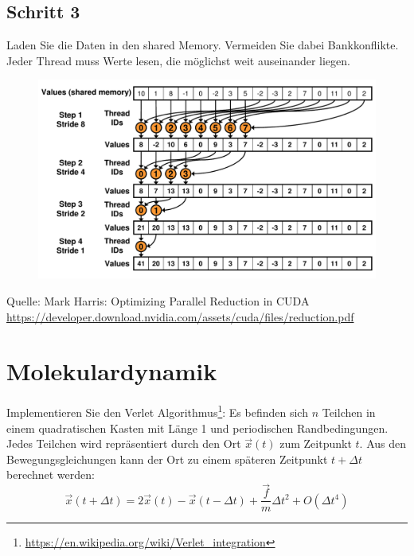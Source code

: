 \documentclass[headsepline=3pt,headinclude=true,12pt,oneside]{scrartcl}
\begin{document}
		\subsection{Schritt 3}
		Laden Sie die Daten in den shared Memory. Vermeiden Sie dabei Bankkonflikte. Jeder Thread muss Werte lesen, die möglichst weit auseinander liegen.
		
		\begin{figure}[h]
			\centering
			\includegraphics[scale=0.4]{3.png}		
		\end{figure}
		
		Quelle: Mark Harris: Optimizing Parallel Reduction in CUDA\\ 
		\url{https://developer.download.nvidia.com/assets/cuda/files/reduction.pdf}
		
	\section{Molekulardynamik}
	Implementieren Sie den Verlet Algorithmus\footnote{\url{https://en.wikipedia.org/wiki/Verlet_integration}}: Es befinden sich $n$ Teilchen in einem quadratischen Kasten mit Länge 1 und periodischen Randbedingungen. Jedes Teilchen wird repräsentiert durch den Ort $\vec{x}(t)$ zum Zeitpunkt $t$.
	Aus den Bewegungsgleichungen kann der Ort zu einem späteren Zeitpunkt $t+\Delta t$ berechnet werden:
	\begin{equation}
		\vec{x}(t+\Delta t) = 2\vec{x}(t) - \vec{x}(t-\Delta t) + \frac{\vec{f}}{m}\Delta t^2 + O(\Delta t^4)
	\end{equation}
	
\end{document}
